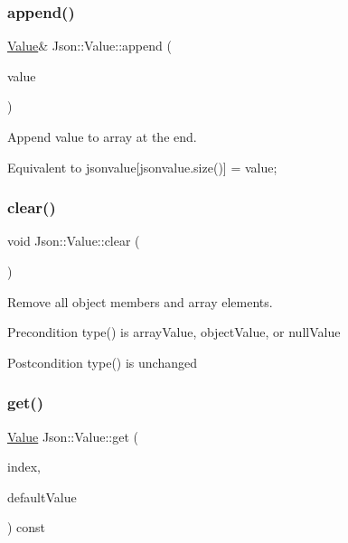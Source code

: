 \subsubsection{\texorpdfstring{append()}{append()}}
{\footnotesize\ttfamily \mbox{\hyperlink{class_json_1_1_value}{Value}}\& Json\+::\+Value\+::append (\begin{DoxyParamCaption}\item[{const \mbox{\hyperlink{class_json_1_1_value}{Value}} \&}]{value }\end{DoxyParamCaption})}



Append value to array at the end. 

Equivalent to jsonvalue\mbox{[}jsonvalue.\+size()\mbox{]} = value; \mbox{\label{class_json_1_1_value_a501a4d67e6c875255c2ecc03ccd2019b}} 
\subsubsection{\texorpdfstring{clear()}{clear()}}
{\footnotesize\ttfamily void Json\+::\+Value\+::clear (\begin{DoxyParamCaption}{ }\end{DoxyParamCaption})}

Remove all object members and array elements. \begin{DoxyPrecond}{Precondition}
type() is array\+Value, object\+Value, or null\+Value 
\end{DoxyPrecond}
\begin{DoxyPostcond}{Postcondition}
type() is unchanged 
\end{DoxyPostcond}
\mbox{\label{class_json_1_1_value_a034eb7bf85a44fa759bdaa232788ca66}} 
\subsubsection{\texorpdfstring{get()}{get()}}
{\footnotesize\ttfamily \mbox{\hyperlink{class_json_1_1_value}{Value}} Json\+::\+Value\+::get (\begin{DoxyParamCaption}\item[{Array\+Index}]{index,  }\item[{const \mbox{\hyperlink{class_json_1_1_value}{Value}} \&}]{default\+Value }\end{DoxyParamCaption}) const}

